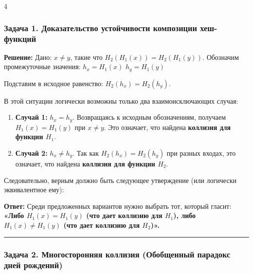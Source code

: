 ﻿\documentclass[8pt,a4paper,landscape]{extarticle}
\newcommand{\tightlist}{}
\begin{document}
\begin{multicols*}{4}
\subsubsection{Задача 1. Доказательство устойчивости композиции хеш-функций}\label{ux437ux430ux434ux430ux447ux430-1.-ux434ux43eux43aux430ux437ux430ux442ux435ux43bux44cux441ux442ux432ux43e-ux443ux441ux442ux43eux439ux447ux438ux432ux43eux441ux442ux438-ux43aux43eux43cux43fux43eux437ux438ux446ux438ux438-ux445ux435ux448-ux444ux443ux43dux43aux446ux438ux439}

\textbf{Решение:} Дано: \(x \neq y\), такие что \(H_2(H_1(x)) = H_2(H_1(y))\). Обозначим промежуточные значения: \(h_x = H_1(x)\) \(h_y = H_1(y)\)

Подставим в исходное равенство: \(H_2(h_x) = H_2(h_y)\).

В этой ситуации логически возможны только два взаимоисключающих случая:

\begin{enumerate}
\def\labelenumi{\arabic{enumi}.}
\tightlist
\item
  \textbf{Случай 1:} \(h_x = h_y\). Возвращаясь к исходным обозначениям, получаем \(H_1(x) = H_1(y)\) при \(x \neq y\). Это означает, что найдена \textbf{коллизия для функции \(H_1\)}.
\item
  \textbf{Случай 2:} \(h_x \neq h_y\). Так как \(H_2(h_x) = H_2(h_y)\) при разных входах, это означает, что найдена \textbf{коллизия для функции \(H_2\)}.
\end{enumerate}

Следовательно, верным должно быть следующее утверждение (или логически эквивалентное ему):

\textbf{Ответ:} Среди предложенных вариантов нужно выбрать тот, который гласит: \textbf{«Либо \(H_1(x) = H_1(y)\) (что дает коллизию для \(H_1\)), либо \(H_1(x) \neq H_1(y)\) (что дает коллизию для \(H_2\))».}

\begin{center}\rule{0.5\linewidth}{0.5pt}\end{center}

\subsubsection{Задача 2. Многосторонняя коллизия (Обобщенный парадокс дней рождений)}\label{ux437ux430ux434ux430ux447ux430-2.-ux43cux43dux43eux433ux43eux441ux442ux43eux440ux43eux43dux43dux44fux44f-ux43aux43eux43bux43bux438ux437ux438ux44f-ux43eux431ux43eux431ux449ux435ux43dux43dux44bux439-ux43fux430ux440ux430ux434ux43eux43aux441-ux434ux43dux435ux439-ux440ux43eux436ux434ux435ux43dux438ux439}


\end{multicols*}
\end{document}
